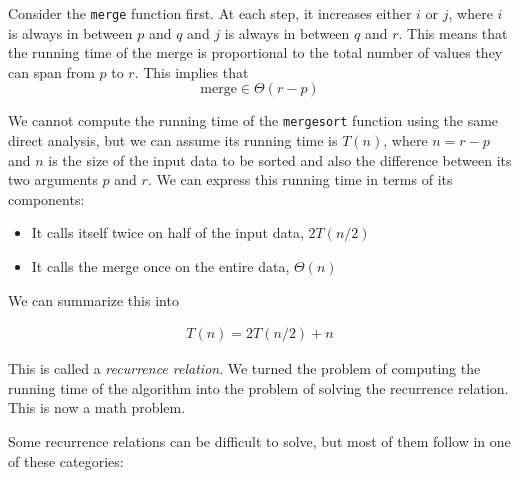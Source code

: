 \documentclass[justified, sixbynine]{tufte-book}
\def\ft{\small\tt}
\theoremstyle{plain}%
\newtheorem * {corollary}{Corollary}
\theoremstyle{definition}
\theoremstyle{remark}
\newtheorem * {remark}{Remark}
\newtheorem * {note}{Note}
\begin{document}
\begin{fullwidth}
Consider the {\ft merge} function first. At each step, it increases either $i$ or $j$, where $i$ is always in between $p$ and $q$ and $j$ is always in between $q$ and $r$. This means that the running time of the merge is proportional to the total number of values they can span from $p$ to $r$. This implies that
\begin{equation}
\textrm{merge} \in \Theta(r-p)
\end{equation}

We cannot compute the running time of the {\ft mergesort} function using the same direct analysis, but we can assume its running time is $T(n)$, where $n=r-p$ and $n$ is the size of the input data to be sorted and also the difference between its two arguments $p$ and $r$. We can express this running time in terms of its components:
\begin{itemize}
\item It calls itself twice on half of the input data, $2T(n/2)$
\item It calls the merge once on the entire data, $\Theta(n)$
\end{itemize}

We can summarize this into

\begin{eqnarray}
T(n) = 2T(n/2) + n
\end{eqnarray}

This is called a {\it recurrence relation}. We turned the problem of computing the running time of the algorithm into the problem of solving the recurrence relation. This is now a math problem.

Some recurrence relations can be difficult to solve, but most of them follow in one of these categories:


\end{fullwidth}
\end{document}
